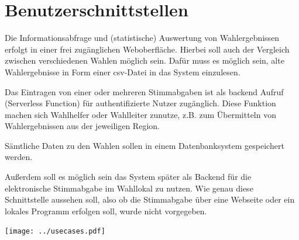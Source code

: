 \documentclass[a4paper,12pt]{article}
\begin{document}
\section{Benutzerschnittstellen}
Die Informationsabfrage und (statistische) Auswertung von Wahlergebnissen erfolgt
in einer frei zugänglichen Weboberfläche. Hierbei soll auch der Vergleich zwischen verschiedenen
Wahlen möglich sein. Dafür muss es möglich sein, alte Wahlergebnisse in Form einer csv-Datei in das System einzulesen.  

Das Eintragen von einer oder mehreren Stimmabgaben ist als backend Aufruf (Serverless Function)
für authentifizierte Nutzer zugänglich. Diese Funktion machen sich Wahlhelfer oder Wahlleiter zunutze,
z.B. zum Übermitteln von Wahlergebnissen aus der jeweiligen Region.

Sämtliche Daten zu den Wahlen sollen in einem Datenbanksystem gespeichert werden.

Außerdem soll es möglich sein das System später als Backend für die elektronische Stimmabgabe im Wahllokal zu nutzen. Wie genau diese Schnittstelle aussehen soll, also ob die Stimmabgabe über eine Webseite oder ein lokales Programm erfolgen soll, wurde nicht vorgegeben.
 

\begin{center}
	\texttt{[image: ../usecases.pdf]}
\end{center}
\end{document}
